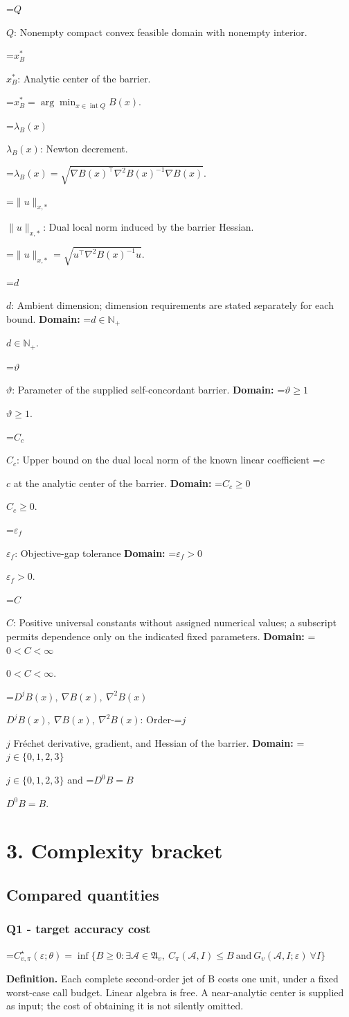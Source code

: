 \documentclass[10pt,a4paper]{article}
\newcommand{\AtlasMath}[1]{\par\begingroup\centering\setbox0=\hbox{$\displaystyle #1$}\ifdim\wd0>1.4\linewidth\typeout{ATLAS WIDE FORMULA: \the\wd0}\fi\ifdim\wd0>\linewidth\resizebox{\linewidth}{!}{\box0}\else\box0\fi\par\endgroup}
\newcommand{\AtlasInlineMath}[1]{\begingroup\setbox0=\hbox{$#1$}\ifdim\wd0>.4\linewidth\endgroup\AtlasMath{#1}\else\endgroup$#1$\fi}
\begin{document}
\AtlasInlineMath{Q}: Nonempty compact convex feasible domain with nonempty interior.

\AtlasInlineMath{x_B^*}: Analytic center of the barrier.


\AtlasMath{x_B^*=\arg\min_{x\in\operatorname{int}Q}B(x).}


\AtlasInlineMath{\lambda_B(x)}: Newton decrement.


\AtlasMath{\lambda_B(x)=\sqrt{\nabla B(x)^\top\nabla^2B(x)^{-1}\nabla B(x)}.}


\AtlasInlineMath{\|u\|_{x,*}}: Dual local norm induced by the barrier Hessian.


\AtlasMath{\|u\|_{x,*}=\sqrt{u^\top\nabla^2B(x)^{-1}u}.}


\AtlasInlineMath{d}: Ambient dimension; dimension requirements are stated separately for each bound. \textbf{Domain:} \AtlasInlineMath{d\in\mathbb{N}_{+}}.

\AtlasInlineMath{\vartheta}: Parameter of the supplied self-concordant barrier. \textbf{Domain:} \AtlasInlineMath{\vartheta\ge1}.

\AtlasInlineMath{C_c}: Upper bound on the dual local norm of the known linear coefficient \AtlasInlineMath{c} at the analytic center of the barrier. \textbf{Domain:} \AtlasInlineMath{C_c\ge0}.

\AtlasInlineMath{\varepsilon_f}: Objective-gap tolerance \textbf{Domain:} \AtlasInlineMath{\varepsilon_f>0}.

\AtlasInlineMath{C}: Positive universal constants without assigned numerical values; a subscript permits dependence only on the indicated fixed parameters. \textbf{Domain:} \AtlasInlineMath{0<C<\infty}.

\AtlasInlineMath{D^jB(x),\ \nabla B(x),\ \nabla^2B(x)}: Order-\AtlasInlineMath{j} Fréchet derivative, gradient, and Hessian of the barrier. \textbf{Domain:} \AtlasInlineMath{j\in\{0,1,2,3\}} and \AtlasInlineMath{D^0B=B}.

\section{3. Complexity bracket}
\subsection{Compared quantities}
\subsubsection{Q1 - target accuracy cost}
\AtlasMath{C^\star_{v,\pi}(\varepsilon;\theta)=\inf\{B\ge0:\exists\mathcal A\in\mathfrak A_v,\ C_\pi(\mathcal A,I)\le B\ \text{and}\ G_v(\mathcal A,I;\varepsilon)\ \forall I\}}
\textbf{Definition.} Each complete second-order jet of B costs one unit, under a fixed worst-case call budget. Linear algebra is free. A near-analytic center is supplied as input; the cost of obtaining it is not silently omitted.
\end{document}
